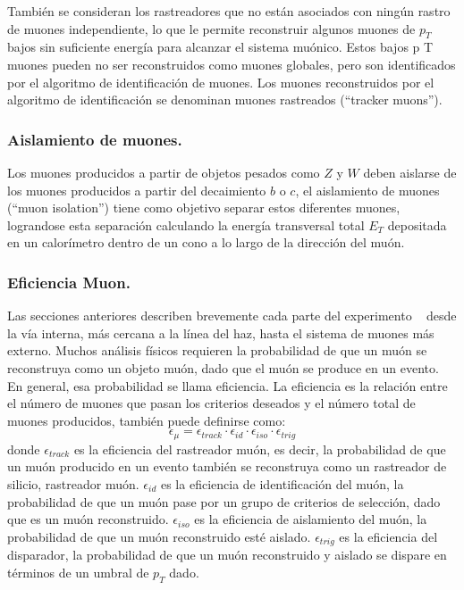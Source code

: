 También se consideran los rastreadores que no están asociados con ningún rastro de muones independiente, lo que le permite reconstruir algunos muones de $p_T$ bajos sin suficiente energía para alcanzar el sistema muónico. Estos bajos p T muones pueden no ser reconstruidos como muones globales, pero son identificados por el algoritmo de identificación de muones. Los muones reconstruidos por el algoritmo de identificación se denominan muones rastreados (``tracker muons'').

\subsubsection{Aislamiento de muones.}

Los muones producidos a partir de objetos pesados como $Z$ y $W$ deben aislarse de los muones producidos a partir del decaimiento $b$ o $c$, el aislamiento de muones (``muon isolation'') tiene como objetivo separar estos diferentes muones, lograndose esta separación calculando la energía transversal total $E_T$ depositada en un calorímetro dentro de un cono a lo largo de la dirección del muón.

\subsubsection{Eficiencia Muon.}

Las secciones anteriores describen brevemente cada parte del experimento \CMS ~ desde la vía interna, más cercana a la línea del haz, hasta el sistema de muones más externo. Muchos análisis físicos requieren la probabilidad de que un muón se reconstruya como un objeto muón, dado que el muón se produce en un evento. En general, esa probabilidad se llama eficiencia. La eficiencia es la relación entre el número de muones que pasan los criterios deseados y el número total de muones producidos, también puede definirse como:
\begin{equation}
\epsilon_\mu = \epsilon_{track} \cdot \epsilon_{id} \cdot 
\epsilon_{iso} \cdot  \epsilon_{trig}
\end{equation}
donde $\epsilon_{track}$ es la eficiencia del rastreador muón, es decir, la probabilidad de que un muón producido en un evento también se reconstruya como un rastreador de silicio, rastreador muón. $\epsilon_{id}$ es la eficiencia de identificación del muón, la probabilidad de que un muón pase por un grupo de criterios de selección, dado que es un muón reconstruido. $\epsilon_{iso}$ es la eficiencia de aislamiento del muón, la probabilidad de que un muón reconstruido esté aislado. $\epsilon_{trig}$ es la eficiencia del disparador, la probabilidad de que un muón reconstruido y aislado se dispare en términos de un umbral de $p_T$ dado.


